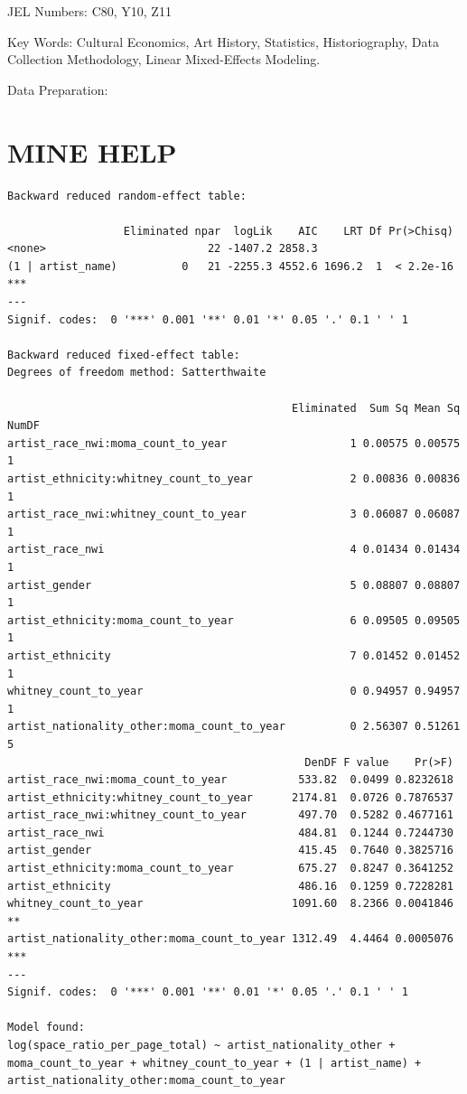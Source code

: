 \documentclass[
  letterpaper,
  DIV=11,
  numbers=noendperiod]{scrreprt}
\begin{document}
JEL Numbers: C80, Y10, Z11

Key Words: Cultural Economics, Art History, Statistics, Historiography,
Data Collection Methodology, Linear Mixed-Effects Modeling.

Data Preparation:

\hypertarget{mine-help}{%
\chapter{MINE HELP}\label{mine-help}}

\begin{verbatim}
Backward reduced random-effect table:

                  Eliminated npar  logLik    AIC    LRT Df Pr(>Chisq)    
<none>                         22 -1407.2 2858.3                         
(1 | artist_name)          0   21 -2255.3 4552.6 1696.2  1  < 2.2e-16 ***
---
Signif. codes:  0 '***' 0.001 '**' 0.01 '*' 0.05 '.' 0.1 ' ' 1

Backward reduced fixed-effect table:
Degrees of freedom method: Satterthwaite 

                                            Eliminated  Sum Sq Mean Sq NumDF
artist_race_nwi:moma_count_to_year                   1 0.00575 0.00575     1
artist_ethnicity:whitney_count_to_year               2 0.00836 0.00836     1
artist_race_nwi:whitney_count_to_year                3 0.06087 0.06087     1
artist_race_nwi                                      4 0.01434 0.01434     1
artist_gender                                        5 0.08807 0.08807     1
artist_ethnicity:moma_count_to_year                  6 0.09505 0.09505     1
artist_ethnicity                                     7 0.01452 0.01452     1
whitney_count_to_year                                0 0.94957 0.94957     1
artist_nationality_other:moma_count_to_year          0 2.56307 0.51261     5
                                              DenDF F value    Pr(>F)    
artist_race_nwi:moma_count_to_year           533.82  0.0499 0.8232618    
artist_ethnicity:whitney_count_to_year      2174.81  0.0726 0.7876537    
artist_race_nwi:whitney_count_to_year        497.70  0.5282 0.4677161    
artist_race_nwi                              484.81  0.1244 0.7244730    
artist_gender                                415.45  0.7640 0.3825716    
artist_ethnicity:moma_count_to_year          675.27  0.8247 0.3641252    
artist_ethnicity                             486.16  0.1259 0.7228281    
whitney_count_to_year                       1091.60  8.2366 0.0041846 ** 
artist_nationality_other:moma_count_to_year 1312.49  4.4464 0.0005076 ***
---
Signif. codes:  0 '***' 0.001 '**' 0.01 '*' 0.05 '.' 0.1 ' ' 1

Model found:
log(space_ratio_per_page_total) ~ artist_nationality_other + moma_count_to_year + whitney_count_to_year + (1 | artist_name) + artist_nationality_other:moma_count_to_year
\end{verbatim}
\end{document}
